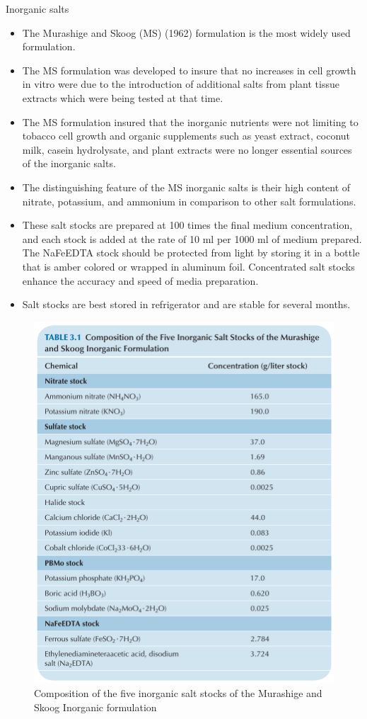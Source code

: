 \documentclass[
  ignorenonframetext,
  aspectratio=169]{beamer}
\providecommand{\tightlist}{%
  \setlength{\itemsep}{0pt}\setlength{\parskip}{0pt}}
\begin{document}
\begin{frame}{Inorganic salts}
\protect\hypertarget{inorganic-salts}{}
\begin{itemize}
\tightlist
\item
  The Murashige and Skoog (MS) (1962) formulation is the most widely
  used formulation.
\item
  The MS formulation was developed to insure that no increases in cell
  growth in vitro were due to the introduction of additional salts from
  plant tissue extracts which were being tested at that time.
\item
  The MS formulation insured that the inorganic nutrients were not
  limiting to tobacco cell growth and organic supplements such as yeast
  extract, coconut milk, casein hydrolysate, and plant extracts were no
  longer essential sources of the inorganic salts.
\end{itemize}
\end{frame}

\begin{frame}{}
\protect\hypertarget{section-2}{}
\begin{itemize}
\tightlist
\item
  The distinguishing feature of the MS inorganic salts is their high
  content of nitrate, potassium, and ammonium in comparison to other
  salt formulations.
\item
  These salt stocks are prepared at 100 times the final medium
  concentration, and each stock is added at the rate of 10 ml per 1000
  ml of medium prepared. The NaFeEDTA stock should be protected from
  light by storing it in a bottle that is amber colored or wrapped in
  aluminum foil. Concentrated salt stocks enhance the accuracy and speed
  of media preparation.
\item
  Salt stocks are best stored in refrigerator and are stable for several
  months.
\end{itemize}
\end{frame}

\begin{frame}{}
\protect\hypertarget{section-3}{}
\begin{figure}
\includegraphics[width=0.38\linewidth]{../images/inorganic_salt_ms} \caption{Composition of the five inorganic salt stocks of the Murashige and Skoog Inorganic formulation}\label{fig:inorganic-salts}
\end{figure}
\end{frame}
\end{document}
